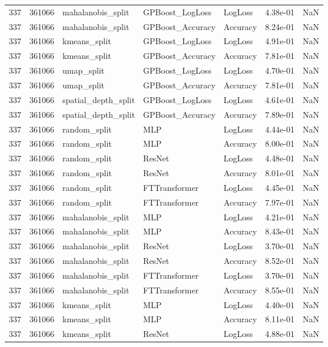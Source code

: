 \begin{tabular}{rrlllrr}
337 & 361066 & mahalanobis\_split & GPBoost\_LogLoss & LogLoss & 4.38e-01 & NaN \\
337 & 361066 & mahalanobis\_split & GPBoost\_Accuracy & Accuracy & 8.24e-01 & NaN \\
337 & 361066 & kmeans\_split & GPBoost\_LogLoss & LogLoss & 4.91e-01 & NaN \\
337 & 361066 & kmeans\_split & GPBoost\_Accuracy & Accuracy & 7.81e-01 & NaN \\
337 & 361066 & umap\_split & GPBoost\_LogLoss & LogLoss & 4.70e-01 & NaN \\
337 & 361066 & umap\_split & GPBoost\_Accuracy & Accuracy & 7.81e-01 & NaN \\
337 & 361066 & spatial\_depth\_split & GPBoost\_LogLoss & LogLoss & 4.61e-01 & NaN \\
337 & 361066 & spatial\_depth\_split & GPBoost\_Accuracy & Accuracy & 7.89e-01 & NaN \\
337 & 361066 & random\_split & MLP & LogLoss & 4.44e-01 & NaN \\
337 & 361066 & random\_split & MLP & Accuracy & 8.00e-01 & NaN \\
337 & 361066 & random\_split & ResNet & LogLoss & 4.48e-01 & NaN \\
337 & 361066 & random\_split & ResNet & Accuracy & 8.01e-01 & NaN \\
337 & 361066 & random\_split & FTTransformer & LogLoss & 4.45e-01 & NaN \\
337 & 361066 & random\_split & FTTransformer & Accuracy & 7.97e-01 & NaN \\
337 & 361066 & mahalanobis\_split & MLP & LogLoss & 4.21e-01 & NaN \\
337 & 361066 & mahalanobis\_split & MLP & Accuracy & 8.43e-01 & NaN \\
337 & 361066 & mahalanobis\_split & ResNet & LogLoss & 3.70e-01 & NaN \\
337 & 361066 & mahalanobis\_split & ResNet & Accuracy & 8.52e-01 & NaN \\
337 & 361066 & mahalanobis\_split & FTTransformer & LogLoss & 3.70e-01 & NaN \\
337 & 361066 & mahalanobis\_split & FTTransformer & Accuracy & 8.55e-01 & NaN \\
337 & 361066 & kmeans\_split & MLP & LogLoss & 4.40e-01 & NaN \\
337 & 361066 & kmeans\_split & MLP & Accuracy & 8.11e-01 & NaN \\
337 & 361066 & kmeans\_split & ResNet & LogLoss & 4.88e-01 & NaN \\

\end{tabular}

